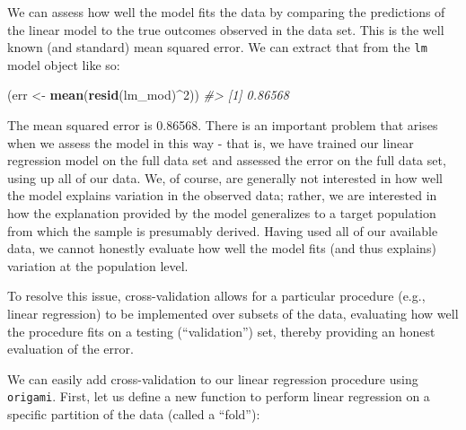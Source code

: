 \documentclass[12pt, krantz2,]{book}
\newenvironment{Shaded}{\begin{snugshade}}{\end{snugshade}}
\newcommand{\CommentTok}[1]{\textcolor[rgb]{0.56,0.35,0.01}{\textit{#1}}}
\newcommand{\DecValTok}[1]{\textcolor[rgb]{0.00,0.00,0.81}{#1}}
\newcommand{\KeywordTok}[1]{\textcolor[rgb]{0.13,0.29,0.53}{\textbf{#1}}}
\newcommand{\NormalTok}[1]{#1}
\newcommand{\OperatorTok}[1]{\textcolor[rgb]{0.81,0.36,0.00}{\textbf{#1}}}
\newcommand{\StringTok}[1]{\textcolor[rgb]{0.31,0.60,0.02}{#1}}
\theoremstyle{definition}
\theoremstyle{definition}
\theoremstyle{definition}
\newcommand{\1}{\mathbbm{1}}
\begin{document}
We can assess how well the model fits the data by comparing the predictions of
the linear model to the true outcomes observed in the data set. This is the well
known (and standard) mean squared error. We can extract that from the \texttt{lm} model
object like so:

\begin{Shaded}
\begin{Highlighting}[]
\NormalTok{(err <-}\StringTok{ }\KeywordTok{mean}\NormalTok{(}\KeywordTok{resid}\NormalTok{(lm_mod)}\OperatorTok{^}\DecValTok{2}\NormalTok{))}
\CommentTok{#> [1] 0.86568}
\end{Highlighting}
\end{Shaded}

The mean squared error is 0.86568. There is an important problem that arises
when we assess the model in this way - that is, we have trained our linear
regression model on the full data set and assessed the error on the full data
set, using up all of our data. We, of course, are generally not interested in
how well the model explains variation in the observed data; rather, we are
interested in how the explanation provided by the model generalizes to a target
population from which the sample is presumably derived. Having used all of our
available data, we cannot honestly evaluate how well the model fits (and thus
explains) variation at the population level.

To resolve this issue, cross-validation allows for a particular procedure (e.g.,
linear regression) to be implemented over subsets of the data, evaluating how
well the procedure fits on a testing (``validation'') set, thereby providing an
honest evaluation of the error.

We can easily add cross-validation to our linear regression procedure using
\texttt{origami}. First, let us define a new function to perform linear regression on a
specific partition of the data (called a ``fold''):
\end{document}
